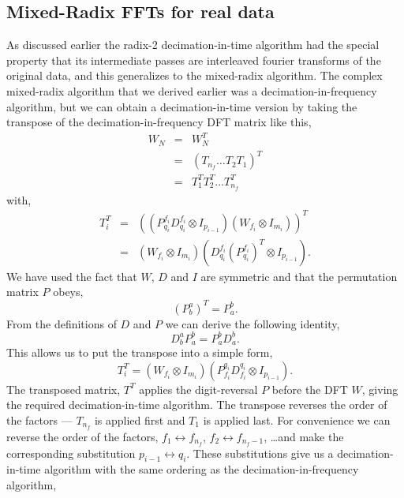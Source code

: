 \documentclass[fleqn,12pt]{article}
\begin{document}
\subsection{Mixed-Radix FFTs for real data}
%
As discussed earlier the radix-2 decimation-in-time algorithm had the
special property that its intermediate passes are interleaved fourier
transforms of the original data, and this generalizes to the
mixed-radix algorithm. The complex mixed-radix algorithm that we
derived earlier was a decimation-in-frequency algorithm, but we can
obtain a decimation-in-time version by taking the transpose of the
decimation-in-frequency DFT matrix like this,
%
\begin{eqnarray}
W_N &=& W_N^T  \\
&=& (T_{n_f} \dots T_2 T_1)^T \\
&=& T_1^T T_2^T \dots T_{n_f}^T
\end{eqnarray}
%
with,
%
\begin{eqnarray}
T_i^T &=& \left( (P^{f_i}_{q_i} D^{f_i}_{q_i} \otimes I_{p_{i-1}})
        (W_{f_i} \otimes I_{m_i}) \right)^T \\
        &=&     (W_{f_i} \otimes I_{m_i})
                ( D^{f_i}_{q_i} (P^{f_i}_{q_i})^T \otimes I_{p_{i-1}}).
\end{eqnarray}
%
We have used the fact that $W$, $D$ and $I$ are symmetric and that the
permutation matrix $P$ obeys,
%
\begin{equation}
(P^a_b)^T = P^b_a.
\end{equation}
%
From the definitions of $D$ and $P$ we can derive the following identity,
%
\begin{equation}
D^a_b P^b_a = P^b_a D^b_a.
\end{equation}
%
This allows us to put the transpose into a simple form,
%
\begin{equation}
T_i^T =         (W_{f_i} \otimes I_{m_i})
                (P^{q_i}_{f_i} D^{q_i}_{f_i} \otimes I_{p_{i-1}}).
\end{equation}
%
The transposed matrix, $T^T$ applies the digit-reversal $P$ before the
DFT $W$, giving the required decimation-in-time algorithm.  The
transpose reverses the order of the factors --- $T_{n_f}$ is applied
first and $T_1$ is applied last. For convenience we can reverse the
order of the factors, $f_1 \leftrightarrow f_{n_f}$, $f_2
\leftrightarrow f_{n_f-1}$, \dots and make the corresponding
substitution $p_{i-1} \leftrightarrow q_i$. These substitutions give
us a decimation-in-time algorithm with the same ordering as the
decimation-in-frequency algorithm,
\end{document}
